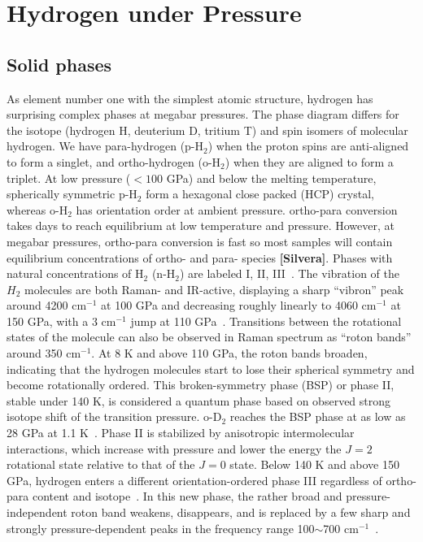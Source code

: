 \section{Hydrogen under Pressure}

\subsection{Solid phases}

As element number one with the simplest atomic structure, hydrogen has surprising complex phases at megabar pressures.
The phase diagram differs for the isotope (hydrogen H, deuterium D, tritium T) and spin isomers of molecular hydrogen.
We have para-hydrogen (p-H$_2$) when the proton spins are anti-aligned to form a singlet, and ortho-hydrogen (o-H$_2$) when they are aligned to form a triplet.
At low pressure ($<100$ GPa) and below the melting temperature, spherically symmetric p-H$_2$ form a hexagonal close packed (HCP) crystal, whereas o-H$_2$ has orientation order at ambient pressure.
ortho-para conversion takes days to reach equilibrium at low temperature and pressure. However, at megabar pressures, ortho-para conversion is fast so most samples will contain equilibrium concentrations of ortho- and para- species \textbf{[Silvera]}.
Phases with natural concentrations of H$_2$ (n-H$_2$) are labeled I, II, III~\cite{Dias2019}.
The vibration of the $H_2$ molecules are both Raman- and IR-active, displaying a sharp ``vibron'' peak around 4200 cm$^{-1}$ at 100 GPa and decreasing roughly linearly to 4060 cm$^{-1}$ at 150 GPa, with a 3 cm$^{-1}$ jump at 110 GPa~\cite{Lorenzana1990}.
Transitions between the rotational states of the molecule can also be observed in Raman spectrum as ``roton bands'' around 350 cm$^{-1}$. At 8 K and above 110 GPa, the roton bands broaden, indicating that the hydrogen molecules start to lose their spherical symmetry and become rotationally ordered. This broken-symmetry phase (BSP) or phase II, stable under 140 K, is considered a quantum phase based on observed strong isotope shift of the transition pressure. o-D$_2$ reaches the BSP phase at as low as 28 GPa at 1.1 K~\cite{Silvera1981}.
Phase II is stabilized by anisotropic intermolecular interactions, which increase with pressure and lower the energy the $J=2$ rotational state relative to that of the $J=0$ state.
Below 140 K and above 150 GPa, hydrogen enters a different orientation-ordered phase III regardless of ortho-para content and isotope~\cite{Cui1995,Goncharov1998}.
In this new phase, the rather broad and pressure-independent roton band weakens, disappears, and is replaced by a few sharp and strongly pressure-dependent peaks in the frequency range 100$\sim$700 cm$^{-1}$~\cite{Goncharov1998}.
